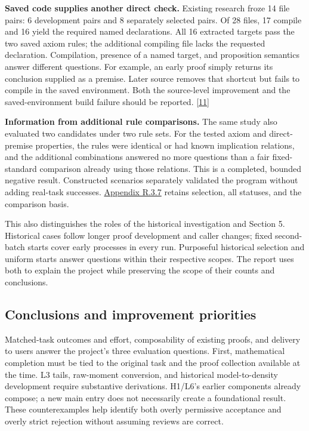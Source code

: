 \textbf{Saved code supplies another direct check.} Existing research froze 14 file pairs: 6 development pairs and 8 separately selected pairs. Of 28 files, 17 compile and 16 yield the required named declarations. All 16 extracted targets pass the two saved axiom rules; the additional compiling file lacks the requested declaration. Compilation, presence of a named target, and proposition semantics answer different questions. For example, an early proof simply returns its conclusion supplied as a premise. Later source removes that shortcut but fails to compile in the saved environment. Both the source-level improvement and the saved-environment build failure should be reported. \hyperlink{ref-11}{\mbox{[11]}}

\textbf{Information from additional rule comparisons.} The same study also evaluated two candidates under two rule sets. For the tested axiom and direct-premise properties, the rules were identical or had known implication relations, and the additional combinations answered no more questions than a fair fixed-standard comparison already using those relations. This is a completed, bounded negative result. Constructed scenarios separately validated the program without adding real-task successes. \href{en-appendix.pdf\#r3-7}{Appendix R.3.7} retains selection, all statuses, and the comparison basis.

This also distinguishes the roles of the historical investigation and Section 5. Historical cases follow longer proof development and caller changes; fixed second-batch starts cover early processes in every run. Purposeful historical selection and uniform starts answer questions within their respective scopes. The report uses both to explain the project while preserving the scope of their counts and conclusions.

\subsection[Conclusions and improvement priorities]{\texorpdfstring{\protect\hypertarget{section-6-4}{}Conclusions and improvement priorities}{Conclusions and improvement priorities}}
Matched-task outcomes and effort, composability of existing proofs, and delivery to users answer the project's three evaluation questions. First, mathematical completion must be tied to the original task and the proof collection available at the time. L3 tails, raw-moment conversion, and historical model-to-density development require substantive derivations. H1/L6's earlier components already compose; a new main entry does not necessarily create a foundational result. These counterexamples help identify both overly permissive acceptance and overly strict rejection without assuming reviews are correct.

